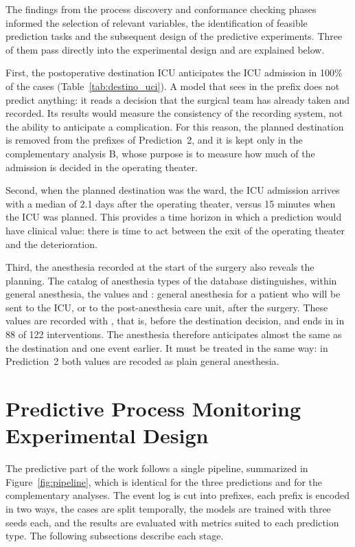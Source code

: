 The findings from the process discovery and conformance checking phases informed the selection of relevant variables, the identification of feasible prediction tasks and the subsequent design of the predictive experiments. Three of them pass directly into the experimental design and are explained below.

First, the postoperative destination ICU anticipates the ICU admission in 100\% of the cases (Table~\ref{tab:destino_uci}). A model that sees  in the prefix does not predict anything: it reads a decision that the surgical team has already taken and recorded. Its results would measure the consistency of the recording system, not the ability to anticipate a complication. For this reason, the planned destination is removed from the prefixes of Prediction~2, and it is kept only in the complementary analysis B, whose purpose is to measure how much of the admission is decided in the operating theater.

Second, when the planned destination was the ward, the ICU admission arrives with a median of 2.1 days after the operating theater, versus 15 minutes when the ICU was planned. This provides a time horizon in which a prediction would have clinical value: there is time to act between the exit of the operating theater and the deterioration.

Third, the anesthesia recorded at the start of the surgery also reveals the planning. The catalog of anesthesia types of the database distinguishes, within general anesthesia, the values  and : general anesthesia for a patient who will be sent to the ICU, or to the post-anesthesia care unit, after the surgery. These values are recorded with , that is, before the destination decision, and  ends in  in 88 of 122 interventions. The anesthesia therefore anticipates almost the same as the destination and one event earlier. It must be treated in the same way: in Prediction~2 both values are recoded as plain general anesthesia.

\section{Predictive Process Monitoring Experimental Design}

The predictive part of the work follows a single pipeline, summarized in Figure~\ref{fig:pipeline}, which is identical for the three predictions and for the complementary analyses. The event log is cut into prefixes, each prefix is encoded in two ways, the cases are split temporally, the models are trained with three seeds each, and the results are evaluated with metrics suited to each prediction type. The following subsections describe each stage.

